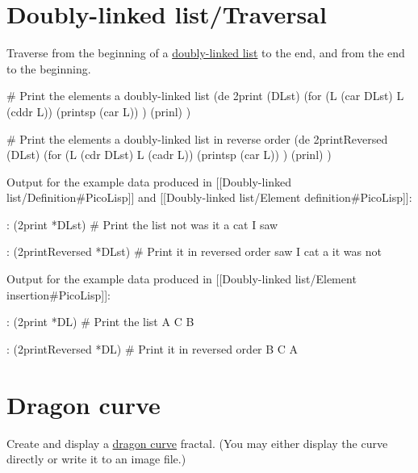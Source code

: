 \pagebreak{}
\section*{Doubly-linked list/Traversal}

Traverse from the beginning of a
\href{/wiki/Doubly-linked\_list/Definition}{doubly-linked list} to the
end, and from the end to the beginning.


\begin{wideverbatim}

# Print the elements a doubly-linked list
(de 2print (DLst)
   (for (L (car DLst) L (cddr L))
      (printsp (car L)) )
   (prinl) )

# Print the elements a doubly-linked list in reverse order
(de 2printReversed (DLst)
   (for (L (cdr DLst) L (cadr L))
      (printsp (car L)) )
   (prinl) )

Output for the example data produced in
[[Doubly-linked list/Definition#PicoLisp]] and
[[Doubly-linked list/Element definition#PicoLisp]]:

: (2print *DLst)                 # Print the list
not was it a cat I saw

: (2printReversed *DLst)         # Print it in reversed order
saw I cat a it was not

Output for the example data produced in
[[Doubly-linked list/Element insertion#PicoLisp]]:

: (2print *DL)                   # Print the list
A C B

: (2printReversed *DL)           # Print it in reversed order
B C A

\end{wideverbatim}

\pagebreak{}
\section*{Dragon curve}

Create and display a
\href{http://en.wikipedia.org/wiki/dragon\_curve}{dragon curve}
fractal. (You may either display the curve directly or write it to an
image file.)


